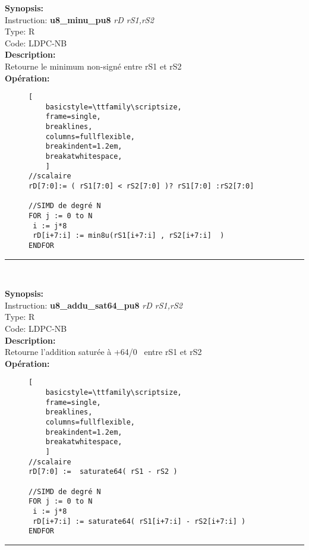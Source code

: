 {\scriptsize
\textbf{Synopsis:}\\
Instruction: \textbf{u8\_minu\_pu8 } \textit{rD rS1,rS2}\\
Type: R\\
Code: LDPC-NB\\
\textbf{Description:}\\
Retourne le minimum non-signé entre rS1 et rS2\\
\textbf{Opération:}\\
    \begin{figure}[H]
    \begin{lstlisting}[
    basicstyle=\ttfamily\scriptsize,
    frame=single,
    breaklines,
    columns=fullflexible,
    breakindent=1.2em,
    breakatwhitespace,
    ]
//scalaire
rD[7:0]:= ( rS1[7:0] < rS2[7:0] )? rS1[7:0] :rS2[7:0]
    
//SIMD de degré N
FOR j := 0 to N    
 i := j*8    
 rD[i+7:i] := min8u(rS1[i+7:i] , rS2[i+7:i]  ) 
ENDFOR
\end{lstlisting}
\end{figure}
}
\rule{8cm}{0.4pt}\\
{\scriptsize
\textbf{Synopsis:}\\
Instruction: \textbf{u8\_addu\_sat64\_pu8 } \textit{rD rS1,rS2}\\
Type: R\\
Code: LDPC-NB\\
\textbf{Description:}\\
Retourne l’addition saturée à +64/0  entre rS1 et rS2 \\
\textbf{Opération:}\\
    \begin{figure}[H]
    \begin{lstlisting}[
    basicstyle=\ttfamily\scriptsize,
    frame=single,
    breaklines,
    columns=fullflexible,
    breakindent=1.2em,
    breakatwhitespace,
    ]
//scalaire
rD[7:0] :=  saturate64( rS1 - rS2 ) 
    
//SIMD de degré N
FOR j := 0 to N
 i := j*8
 rD[i+7:i] := saturate64( rS1[i+7:i] - rS2[i+7:i] )
ENDFOR
\end{lstlisting}
\end{figure}
}
\rule{8cm}{0.4pt}\\
